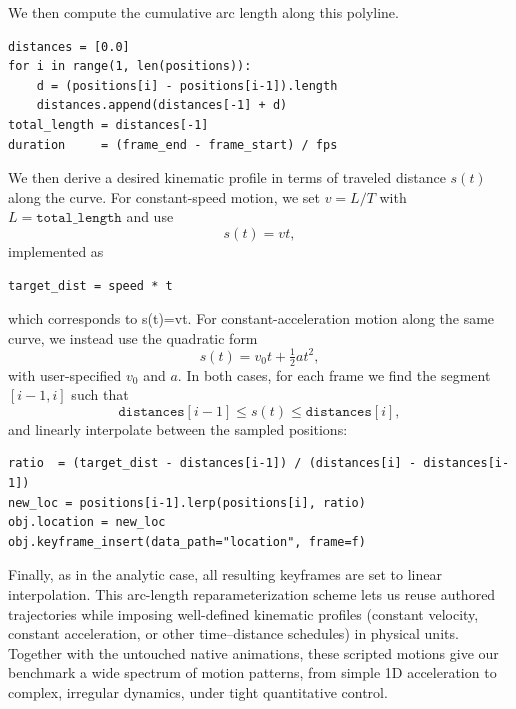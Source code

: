 
We then compute the cumulative arc length along this polyline.

\begin{verbatim}
distances = [0.0]
for i in range(1, len(positions)):
    d = (positions[i] - positions[i-1]).length
    distances.append(distances[-1] + d)
total_length = distances[-1]
duration     = (frame_end - frame_start) / fps
\end{verbatim}
\noindent We then derive a desired kinematic profile in terms of traveled distance $s(t)$ along the curve. For constant-speed motion, we set $v = L/T$ with $L = \texttt{total\_length}$ and use
\[
s(t) = v t,
\]
implemented as

\begin{verbatim}
target_dist = speed * t
\end{verbatim}
\noindent which corresponds to s(t)=vt. For constant-acceleration motion along the same curve, we instead use the quadratic form
\[
s(t) = v_0 t + \tfrac{1}{2} a t^{2},
\]
with user-specified $v_0$ and $a$. In both cases, for each frame we find the segment $[i-1,i]$ such that
\[
\texttt{distances}[i-1] \le s(t) \le \texttt{distances}[i],
\]
and linearly interpolate between the sampled positions:

\begin{verbatim}
ratio  = (target_dist - distances[i-1]) / (distances[i] - distances[i-1])
new_loc = positions[i-1].lerp(positions[i], ratio)
obj.location = new_loc
obj.keyframe_insert(data_path="location", frame=f)
\end{verbatim}

Finally, as in the analytic case, all resulting keyframes are set to linear interpolation. This arc-length reparameterization scheme lets us reuse authored trajectories while imposing well-defined kinematic profiles (constant velocity, constant acceleration, or other time–distance schedules) in physical units. Together with the untouched native animations, these scripted motions give our benchmark a wide spectrum of motion patterns, from simple 1D acceleration to complex, irregular dynamics, under tight quantitative control.

